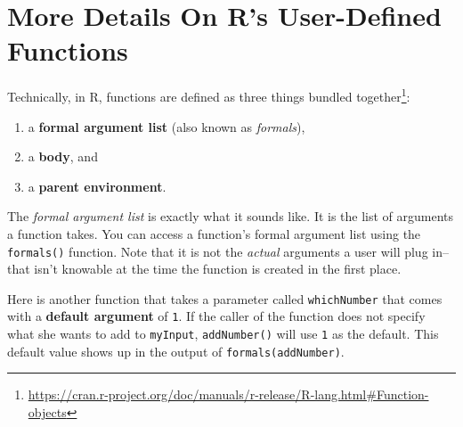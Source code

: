 \documentclass[
  12pt,
  krantz2]{krantz}
\makeatletter
\newenvironment{Shaded}{\begin{snugshade}}{\end{snugshade}}
\newcommand{\AttributeTok}[1]{\textcolor[rgb]{0.61,0.61,0.61}{#1}}
\newcommand{\CommentTok}[1]{\textcolor[rgb]{0.37,0.37,0.37}{\textit{#1}}}
\newcommand{\ControlFlowTok}[1]{\textcolor[rgb]{0.27,0.27,0.27}{\textbf{#1}}}
\newcommand{\DecValTok}[1]{\textcolor[rgb]{0.06,0.06,0.06}{#1}}
\newcommand{\DocumentationTok}[1]{\textcolor[rgb]{0.37,0.37,0.37}{\textbf{\textit{#1}}}}
\newcommand{\FunctionTok}[1]{\textcolor[rgb]{0,0,0}{#1}}
\newcommand{\NormalTok}[1]{#1}
\newcommand{\OtherTok}[1]{\textcolor[rgb]{0.37,0.37,0.37}{#1}}
\newcommand{\SpecialCharTok}[1]{\textcolor[rgb]{0,0,0}{#1}}
\providecommand{\tightlist}{%
  \setlength{\itemsep}{0pt}\setlength{\parskip}{0pt}}
\renewcommand{\href}[2]{#2\footnote{\url{#1}}}
\newenvironment{kframe}{%
\medskip{}
\setlength{\fboxsep}{.8em}
 \def\at@end@of@kframe{}%
 \ifinner\ifhmode%
  \def\at@end@of@kframe{\end{minipage}}%
  \begin{minipage}{\columnwidth}%
 \fi\fi%
 \def\FrameCommand##1{\hskip\@totalleftmargin \hskip-\fboxsep
 \colorbox{shadecolor}{##1}\hskip-\fboxsep
     \hskip-\linewidth \hskip-\@totalleftmargin \hskip\columnwidth}%
 \MakeFramed {\advance\hsize-\width
   \@totalleftmargin\z@ \linewidth\hsize
   \@setminipage}}%
 {\par\unskip\endMakeFramed%
 \at@end@of@kframe}
\renewenvironment{Shaded}{\begin{kframe}}{\end{kframe}}
\makeatother
\begin{document}
\hypertarget{more-details-on-rs-user-defined-functions}{%
\section{More Details On R's User-Defined Functions}\label{more-details-on-rs-user-defined-functions}}

Technically, in R, functions are \href{https://cran.r-project.org/doc/manuals/r-release/R-lang.html\#Function-objects}{defined as three things bundled together}:

\begin{enumerate}
\def\labelenumi{\arabic{enumi}.}
\tightlist
\item
  a \textbf{formal argument list} (also known as \emph{formals}),
\item
  a \textbf{body}, and
\item
  a \textbf{parent environment}.
\end{enumerate}

The \emph{formal argument list} is exactly what it sounds like. It is the list of arguments a function takes. You can access a function's formal argument list using the \texttt{formals()} function. Note that it is not the \emph{actual} arguments a user will plug in--that isn't knowable at the time the function is created in the first place.

Here is another function that takes a parameter called \texttt{whichNumber} that comes with a \textbf{default argument} of \texttt{1}. If the caller of the function does not specify what she wants to add to \texttt{myInput}, \texttt{addNumber()} will use \texttt{1} as the default. This default value shows up in the output of \texttt{formals(addNumber)}.

\begin{Shaded}
\end{Shaded}
\end{document}
